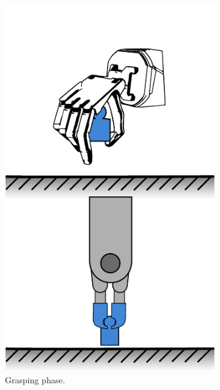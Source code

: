 \begin{figure}[h]
\begin{subfigure}[b]{0.24\textwidth}
		\includegraphics[width=\textwidth]{chapters/introduction/fig/pipeline-2.pdf}
		\caption{Grasping phase.}
		\label{fig:grasping-phase}
	\end{subfigure}
	\hfill
	\begin{subfigure}[b]{0.24\textwidth}
		\centering

\end{subfigure}
\end{figure}
